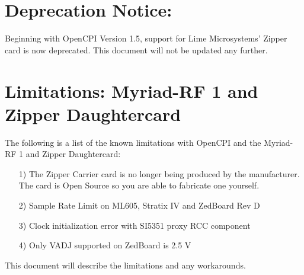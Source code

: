 \iffalse
This file is protected by Copyright. Please refer to the COPYRIGHT file
distributed with this source distribution.

This file is part of OpenCPI <http://www.opencpi.org>

OpenCPI is free software: you can redistribute it and/or modify it under the
terms of the GNU Lesser General Public License as published by the Free Software
Foundation, either version 3 of the License, or (at your option) any later
version.

OpenCPI is distributed in the hope that it will be useful, but WITHOUT ANY
WARRANTY; without even the implied warranty of MERCHANTABILITY or FITNESS FOR A
PARTICULAR PURPOSE. See the GNU Lesser General Public License for more details.

You should have received a copy of the GNU Lesser General Public License along
with this program. If not, see <http://www.gnu.org/licenses/>.
\fi

\def\docTitle{Zipper/Myriad-RF 1 Daughtercards}
\def\snippetpath{../../../../../../doc/av/tex/snippets}



\maketitle
\thispagestyle{empty}
\newpage

\section*{Deprecation Notice:}
Beginning with OpenCPI Version 1.5, support for Lime Microsystems' Zipper card is now deprecated. This document will not be updated any further.
\section*{Limitations: Myriad-RF 1 and Zipper Daughtercard}
The following is a list of the known limitations with OpenCPI and the Myriad-RF 1 and Zipper Daughtercard:\par
	\begin{itemize}
	\item[1)] The Zipper Carrier card is no longer being produced by the manufacturer. The card is Open Source so you are able to fabricate one yourself.
	\item[2)] Sample Rate Limit on ML605, Stratix IV and ZedBoard Rev D
	\item[3)] Clock initialization error with SI5351 proxy RCC component
	\item[4)] Only VADJ supported on ZedBoard is 2.5 V
	\end{itemize}
This document will describe the limitations and any workarounds.
